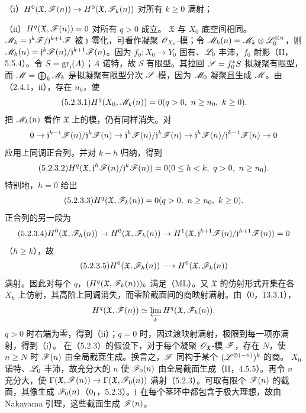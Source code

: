 （i）$H^0(\mathfrak X,\mathscr F(n))\to H^0(\mathfrak X,\mathscr F_k(n))$ 对所有 $k\ge0$ 满射；

（ii）$H^q(\mathfrak X,\mathscr F(n))=0$ 对所有 $q>0$ 成立。
\eproof
$\mathfrak X$ 与 $X_0$ 底空间相同。$\mathscr M_k=\mathfrak j^k\mathscr F/\mathfrak j^{k+1}\mathscr F$ 被 $\mathfrak j$ 零化，可看作凝聚 $\mathscr O_{X_0}$-模；令 $\mathscr M_k(n)=\mathscr M_k\otimes\mathscr L_0^{\otimes n}$，则 $\mathscr M_k(n)=\mathfrak j^k\mathscr F(n)/\mathfrak j^{k+1}\mathscr F(n)$。因为 $f_0:X_0\to Y_0$ 固有、$\mathscr L_0$ 丰沛，$f_0$ 射影（II，5.5.4）。令 $S=\operatorname{gr}_{\mathfrak j}(A)$；$A$ 诺特，故 $S$ 有限型。其拉回 $\mathscr S=f_0^*S$ 拟凝聚有限型，而 $\mathscr M=\bigoplus_k\mathscr M_k$ 是拟凝聚有限型分次 $\mathscr S$-模，因为 $\mathscr M_0$ 凝聚且生成 $\mathscr M$。由（2.4.1，ii），存在 $n_0$，使
\begin{equation}\tag{5.2.3.1}
H^q(X_0,\M_k(n))=0\qquad(q>0,\ n\ge n_0,\ k\ge0).
\end{equation}
把 $\mathscr M_k(n)$ 看作 $\mathfrak X$ 上的模，仍有同样消失。对
\[
0\to\mathfrak j^{k-1}\mathscr F(n)/\mathfrak j^k\mathscr F(n)\to
\mathfrak j^h\mathscr F(n)/\mathfrak j^k\mathscr F(n)\to
\mathfrak j^h\mathscr F(n)/\mathfrak j^{k-1}\mathscr F(n)\to0
\]
应用上同调正合列，并对 $k-h$ 归纳，得到
\begin{equation}\tag{5.2.3.2}
H^q(\mathfrak X,\frj^h\F(n)/\frj^k\F(n))=0
\quad(0\le h<k,\ q>0,\ n\ge n_0).
\end{equation}
特别地，$h=0$ 给出
\begin{equation}\tag{5.2.3.3}
H^q(\mathfrak X,\F_k(n))=0\qquad(q>0,\ n\ge n_0,\ k\ge0).
\end{equation}
正合列的另一段为
\begin{equation}\tag{5.2.3.4}
H^0(\mathfrak X,\F_h(n))\to H^0(\mathfrak X,\F_k(n))
\to H^1(\mathfrak X,\frj^{k+1}\F(n)/\frj^{h+1}\F(n))=0
\end{equation}
（$h\ge k$），故
\begin{equation}\tag{5.2.3.5}
H^0(\mathfrak X,\F_h(n))\longrightarrow H^0(\mathfrak X,\F_k(n))
\end{equation}
满射。因此对每个 $q$，$(H^q(\mathfrak X,\mathscr F_k(n)))_k$ 满足（ML）。又 $\mathfrak X$ 的仿射形式开集在各 $X_k$ 上仿射，其高阶上同调消失，而零阶截面间的商映射满射。由（0，13.3.1），
\[
H^q(\mathfrak X,\mathscr F(n))\simeq\varprojlim_kH^q(\mathfrak X,\mathscr F_k(n)).
\]
$q>0$ 时右端为零，得到（ii）；$q=0$ 时，因过渡映射满射，极限到每一项亦满射，得到（i）。\finishproof
{}
在（5.2.3）的假设下，对于每个凝聚 $\mathscr O_{\mathfrak X}$-模 $\mathscr F$，存在 $N$，使 $n\ge N$ 时 $\mathscr F(n)$ 由全局截面生成。换言之，$\mathscr F$ 同构于某个 $(\mathscr L^{\otimes(-n)})^k$ 的商。
\eproof
$X_0$ 诺特、$\mathscr L_0$ 丰沛，故充分大的 $n$ 使 $\mathscr F_0(n)$ 由全局截面生成（II，4.5.5）。再令 $n$ 充分大，使 $\Gamma(\mathfrak X,\mathscr F(n))\to\Gamma(\mathfrak X,\mathscr F_0(n))$ 满射（5.2.3）。可取有限个 $\mathscr F(n)$ 的截面，其像生成 $\mathscr F_0(n)$（$0_{\mathrm I}$，5.2.3）。$\mathfrak j$ 在每个茎环中都包含于极大理想，故由 Nakayama 引理，这些截面生成 $\mathscr F(n)$。\finishproof

